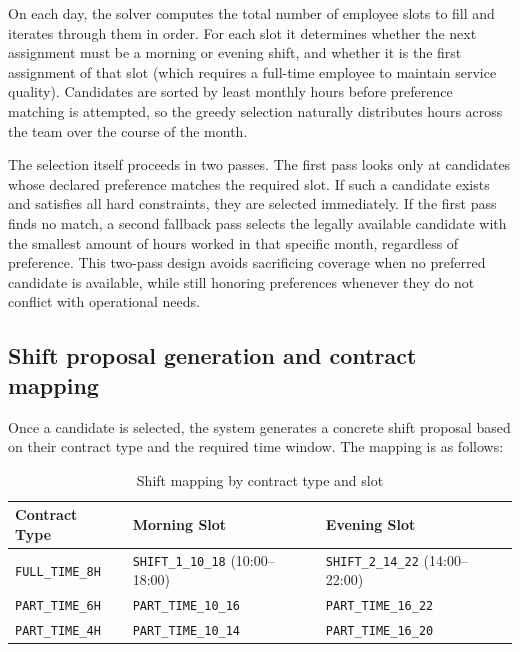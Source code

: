 \par On each day, the solver computes the total number of employee slots to fill and iterates through them in order. For each slot it determines whether the next assignment must be a morning or evening shift, and whether it is the first assignment of that slot (which requires a full-time employee to maintain service quality). Candidates are sorted by least monthly hours before preference matching is attempted, so the greedy selection naturally distributes hours across the team over the course of the month.

\par The selection itself proceeds in two passes. The first pass looks only at candidates whose declared preference matches the required slot. If such a candidate exists and satisfies all hard constraints, they are selected immediately. If the first pass finds no match, a second fallback pass selects the legally available candidate with the smallest amount of hours worked in that specific month, regardless of preference. This two-pass design avoids sacrificing coverage when no preferred candidate is available, while still honoring preferences whenever they do not conflict with operational needs.

\subsection{Shift proposal generation and contract mapping}
\par Once a candidate is selected, the system generates a concrete shift proposal based on their contract type and the required time window. The mapping is as follows:

\begin{table}[h]
\centering
\caption{Shift mapping by contract type and slot}
\begin{tabular}{|l|l|l|}
\hline
\textbf{Contract Type} & \textbf{Morning Slot} & \textbf{Evening Slot} \\ \hline
\texttt{FULL\_TIME\_8H} 
& \texttt{SHIFT\_1\_10\_18} (10:00--18:00) 
& \texttt{SHIFT\_2\_14\_22} (14:00--22:00) \\ \hline

\texttt{PART\_TIME\_6H} 
& \texttt{PART\_TIME\_10\_16} 
& \texttt{PART\_TIME\_16\_22} \\ \hline

\texttt{PART\_TIME\_4H} 
& \texttt{PART\_TIME\_10\_14} 
& \texttt{PART\_TIME\_16\_20} \\ \hline
\end{tabular}
\label{tab:shift_mapping}
\end{table}

